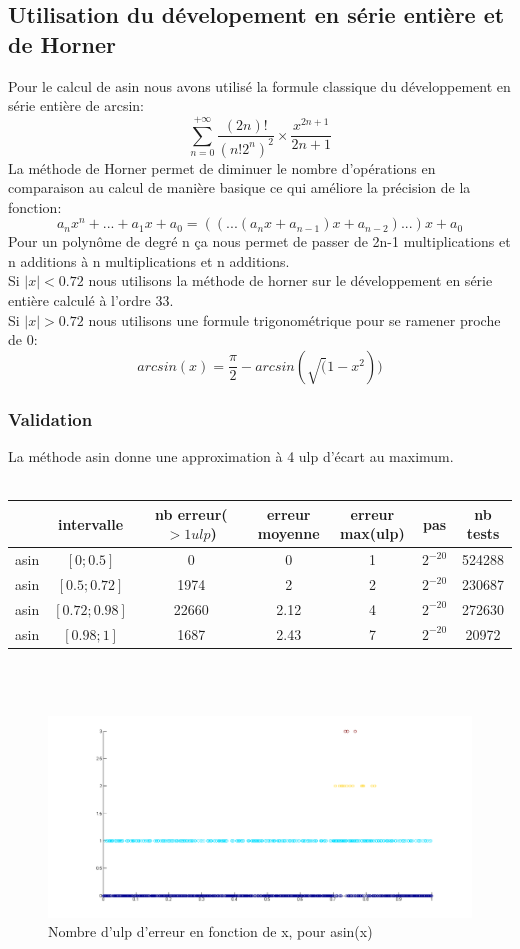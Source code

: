 \documentclass[a4,12pt]{article}
\begin{document}
\subsection{Utilisation du dévelopement en série entière et de Horner}
Pour le calcul de asin nous avons utilisé la formule classique du développement en série entière de arcsin:
$$
    \sum_{n=0}^{+ \infty}\frac{(2n)!}{(n!2^n)^2} \times \frac{x^{2n+1}}{2n+1} 
$$
La méthode de Horner permet de diminuer le nombre d'opérations en comparaison au calcul de manière basique ce qui améliore la précision de la fonction:
$$a_{n}x^n + . . . + a_{1}x + a_0 = ((. . .(a_{n}x + a_{n-1})x + a_{n-2}). . .) x + a_0$$
Pour un polynôme de degré n ça nous permet de passer de 2n-1 multiplications et n additions à n multiplications et n additions.\\
Si $\mid x \mid< 0.72$ nous utilisons la méthode de horner sur le développement en série entière calculé à l'ordre 33.\\
Si $\mid x \mid> 0.72$ nous utilisons une formule trigonométrique pour se ramener proche de 0:
$$
arcsin(x) = \frac{\pi }{2} - arcsin(\sqrt(1-x^2)) 
$$



\subsubsection{Validation}
La méthode asin donne une approximation à 4 ulp d'écart au maximum.\\
\\

\hspace{-3cm}
\begin{tabular}{|c|c|c|c|c|c|c|}
\hline
 & intervalle & nb erreur($>1 ulp$) & erreur moyenne & erreur max(ulp) & pas & nb tests \\
\hline
asin & $[0;0.5]$ & 0 & 0 & 1 &$2^{-20}$ & 524288\\
\hline
asin & $[0.5;0.72]$ & 1974 & 2 & 2 & $2^{-20}$ & 230687\\
\hline
asin & $[0.72;0.98]$ & 22660 & 2.12 & 4 & $2^{-20}$ & 272630\\
\hline
asin & $[0.98;1]$ & 1687 & 2.43 & 7 & $2^{-20}$ & 20972\\
\hline
\end{tabular}\\
\\

\hspace{-6cm}
\begin{figure}[h!]
    \centering
    \includegraphics[scale=0.5]{asin}
    \caption{Nombre d'ulp d'erreur en fonction de x, pour asin(x)}
    \label{fig:my_label}
\end{figure}
\end{document}
